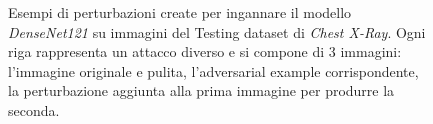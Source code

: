 \begin{figure}[!h]
            \quad
            \quad
            \quad
            
            \caption{Esempi di perturbazioni create per ingannare il modello \textit{DenseNet121} su immagini del Testing dataset di \textit{Chest X-Ray}. Ogni riga rappresenta un attacco diverso e si compone di 3 immagini: l'immagine originale e pulita, l'adversarial example corrispondente, la perturbazione aggiunta alla prima immagine per produrre la seconda.}
            \label{Attacks Examples Chest X-Ray}
        \end{figure}
    

